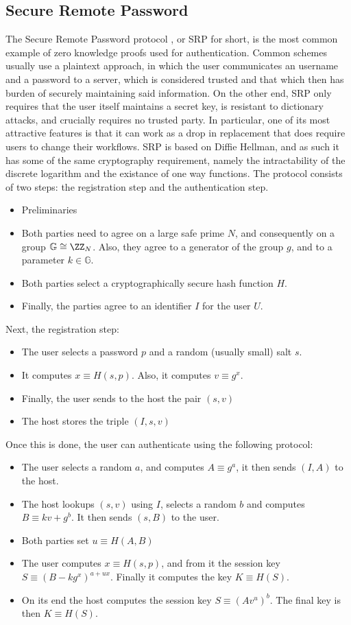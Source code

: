 \documentclass{article}
\begin{document}
\subsection{Secure Remote Password}
The Secure Remote Password protocol \cite{wuSecureRemotePassword1997}, or SRP for short, is the most common 
example of zero knowledge proofs used for authentication. Common schemes usually use a plaintext approach,
in which the user communicates an username and a password to a server, which is considered trusted and that 
which then has burden of securely maintaining said information. On the other end, SRP only requires that 
the user itself maintains a secret key, is resistant to dictionary attacks, and crucially requires no trusted party.
In particular, one of its most attractive features is that it can work as a drop in replacement that does require users
to change their workflows.
SRP is based on Diffie Hellman, and as such it has some of the same cryptography requirement, namely the intractability
of the discrete logarithm and the existance of one way functions.
The protocol consists of two steps: the registration step and the authentication step. 
\begin{itemize}
    \item Preliminaries
    \item Both parties need to agree on a large safe prime $N$, and consequently on a group $\mathbb{G} \cong \ZZ_N$. 
          Also, they agree to a generator of the group $g$, and to a parameter $k \in \mathbb{G}$. 
    \item Both parties select a cryptographically secure hash function $H$.
    \item Finally, the parties agree to an identifier $I$ for the user $U$.
\end{itemize}
Next, the registration step:
\begin{itemize}
    \item The user selects a password $p$ and a random (usually small) salt $s$. 
    \item It computes $x \equiv H(s, p)$. Also, it computes $v \equiv g^x$.
    \item Finally, the user sends to the host the pair $(s, v)$
    \item The host stores the triple $(I, s, v)$
\end{itemize}
Once this is done, the user can authenticate using the following protocol:
\begin{itemize}
    \item The user selects a random $a$, and computes $A \equiv g^a$, it then sends $(I, A)$ to the host.
    \item The host lookups $(s,v)$ using $I$, selects a random $b$ and computes $B \equiv kv + g^b$. It then sends $(s, B)$ to the user.
    \item Both parties set $u \equiv H(A, B)$
    \item The user computes $x \equiv H(s, p)$, and from it the session key $S \equiv (B - kg^x)^{a + ux}$. Finally it computes the key
          $K \equiv H(S)$. 
    \item On its end the host computes the session key $S \equiv (Av^u)^b$. The final key is then $K \equiv H(S)$.
\end{itemize}
\end{document}
